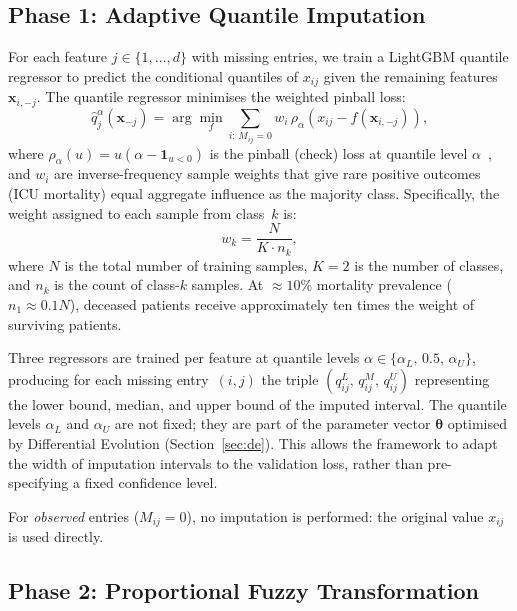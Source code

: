 \documentclass[a4paper,fleqn,longmktitle]{cas-sc}
\begin{document}
	\subsection{Phase 1: Adaptive Quantile Imputation}
	\label{sec:phase1}
	
	For each feature $j \in \{1, \ldots, d\}$ with missing entries,
	we train a LightGBM quantile regressor to predict the conditional
	quantiles of $x_{ij}$ given the remaining features
	$\mathbf{x}_{i,-j}$.
	The quantile regressor minimises the weighted pinball loss:
	\begin{equation}
		\hat{q}^{\alpha}_{j}(\mathbf{x}_{-j})
		= \arg\min_{f}
		\sum_{i:\, M_{ij}=0}
		w_i \,\rho_{\alpha}\!\left(x_{ij} - f(\mathbf{x}_{i,-j})\right),
		\label{eq:quantile_regression}
	\end{equation}
	where $\rho_{\alpha}(u) = u(\alpha - \mathbf{1}_{u<0})$ is the
	pinball (check) loss at quantile level $\alpha$~\citep{koenker1978regression}, and $w_i$ are
	inverse-frequency sample weights that give rare positive outcomes
	(ICU mortality) equal aggregate influence as the majority class.
	Specifically, the weight assigned to each sample from class~$k$ is:
	\begin{equation}
		w_k = \frac{N}{K \cdot n_k},
		\label{eq:class_weights}
	\end{equation}
	where $N$ is the total number of training samples, $K = 2$ is the
	number of classes, and $n_k$ is the count of class-$k$ samples.
	At $\approx 10\%$ mortality prevalence ($n_1 \approx 0.1N$),
	deceased patients receive approximately ten times the weight of
	surviving patients.
	
	Three regressors are trained per feature at quantile levels
	$\alpha \in \{\alpha_L,\, 0.5,\, \alpha_U\}$, producing for each
	missing entry~$(i,j)$ the triple
	$(q^L_{ij},\, q^M_{ij},\, q^U_{ij})$ representing the lower bound,
	median, and upper bound of the imputed interval.
	The quantile levels $\alpha_L$ and $\alpha_U$ are not fixed;
	they are part of the parameter vector $\boldsymbol{\theta}$
	optimised by Differential Evolution (Section~\ref{sec:de}).
	This allows the framework to adapt the width of imputation
	intervals to the validation loss, rather than pre-specifying a
	fixed confidence level.
	
	For \emph{observed} entries ($M_{ij} = 0$), no imputation is
	performed: the original value $x_{ij}$ is used directly.
	
	\subsection{Phase 2: Proportional Fuzzy Transformation}
	\label{sec:phase2}
	
\end{document}
